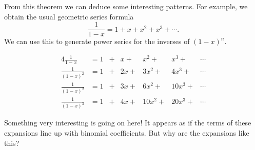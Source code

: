 From this theorem we can deduce some interesting patterns. For example, we obtain the usual geometric series formula
\[\frac{1}{1-x} = 1 + x + x^2 + x^3 + \cdots.\] We can use this to generate power series for the inverses of $(1-x)^n$.

\begin{alignat*}{4}
\frac{1}{1-x} &= 1 &{}+&{} x  +&{}  x^2 +&{}  x^3 + &\cdots \\
\frac{1}{(1-x)^2} &= 1 &{}+ &{} 2x + &{} 3x^2 + &{} 4x^3  + &\cdots \\
\frac{1}{(1-x)^3} &=  1 &{}+ &{} 3x + &{} 6x^2 + &{} 10x^3  + &\cdots \\
\frac{1}{(1-x)^3} &=  1 &{}+ &{} 4x + &{} 10x^2 + &{} 20x^3  + &\cdots
\end{alignat*}

Something very interesting is going on here! It appears as if the terms of these expansions line up with binomial coefficients. But why are the expansions like this?